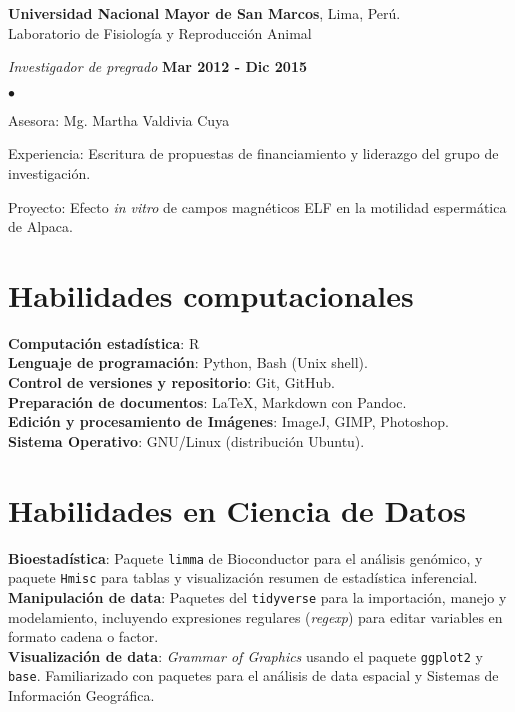 \documentclass[margin,line]{res}
\newenvironment{list1}{
	\begin{list}{\ding{113}}{%
			\setlength{\itemsep}{0in}
			\setlength{\parsep}{0in} \setlength{\parskip}{0in}
			\setlength{\topsep}{0in} \setlength{\partopsep}{0in}
			\setlength{\leftmargin}{0.17in}}}{\end{list}}
\newenvironment{list2}{
	\begin{list}{$\bullet$}{%
			\setlength{\itemsep}{0in}
			\setlength{\parsep}{0in} \setlength{\parskip}{0in}
			\setlength{\topsep}{0in} \setlength{\partopsep}{0in}
			\setlength{\leftmargin}{0.2in}}}{\end{list}}
\begin{document}
\begin{resume}
		{\bf Universidad Nacional Mayor de San Marcos}, Lima, Perú.\\
		Laboratorio de Fisiología y Reproducción Animal\\
		\vspace*{-.1in}
		\begin{list1}
			\item[] {\em Investigador de pregrado} \hfill {\bf Mar 2012 - Dic 2015}\\
			\vspace*{-.1in}
			\begin{list2}
				\item Asesora: Mg. Martha Valdivia Cuya
				\item Experiencia: Escritura de propuestas de financiamiento y liderazgo del grupo de investigación.
				\item Proyecto: Efecto \textit{in vitro} de campos magnéticos ELF en la motilidad espermática de Alpaca.\\
			\end{list2}
		\end{list1}
		
		\section{\sc Habilidades computacionales}
		{\bf Computación estadística}: R\\
		{\bf Lenguaje de programación}: Python, Bash (Unix shell).\\%
		{\bf Control de versiones y repositorio}: Git, GitHub.\\ %
		{\bf Preparación de documentos}: LaTeX, Markdown con Pandoc.\\ 
		{\bf Edición y procesamiento de Imágenes}: ImageJ, GIMP, Photoshop.\\
		{\bf Sistema Operativo}: GNU/Linux (distribución Ubuntu).\\ %
		
		\section{\sc Habilidades en Ciencia de Datos}%
		{\bf Bioestadística}: Paquete \texttt{limma} de Bioconductor para el análisis genómico, y paquete \texttt{Hmisc} para tablas y visualización resumen de estadística inferencial.\\ 
		{\bf Manipulación de data}: Paquetes del \texttt{tidyverse} para la importación, manejo y modelamiento, incluyendo expresiones regulares (\textit{regexp}) para editar variables en formato cadena o factor.\\
		{\bf Visualización de data}: \textit{Grammar of Graphics} usando el paquete \texttt{ggplot2} y \texttt{base}. Familiarizado con paquetes para el análisis de data espacial y Sistemas de Información Geográfica.\\
		

\end{resume}
\end{document}
